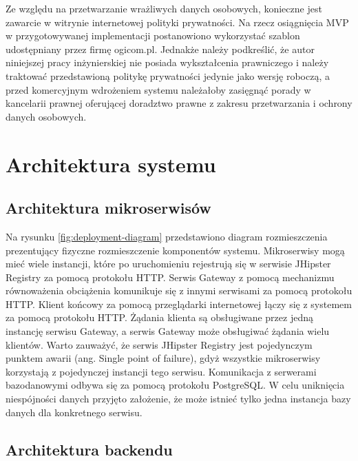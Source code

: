 \par
Ze względu na przetwarzanie wrażliwych danych osobowych, konieczne jest zawarcie w witrynie internetowej polityki prywatności.
Na rzecz osiągnięcia MVP w przygotowywanej implementacji postanowiono wykorzystać szablon udostępniany przez firmę ogicom.pl\cite{url:ogicom-privacy-policy}.
Jednakże należy podkreślić, że autor niniejszej pracy inżynierskiej nie posiada wykształcenia prawniczego
i należy traktować przedstawioną politykę prywatności jedynie jako wersję roboczą,
a przed komercyjnym wdrożeniem systemu należałoby zasięgnąć porady w kancelarii prawnej oferującej doradztwo prawne z zakresu przetwarzania i ochrony danych osobowych.

\section{Architektura systemu}\label{sec:system-architecture}
\subsection{Architektura mikroserwisów}\label{subsec:system-architecture:microservices}

\noindent
{}

Na rysunku \ref{fig:deployment-diagram} przedstawiono diagram rozmieszczenia prezentujący fizyczne rozmieszczenie komponentów systemu.
Mikroserwisy mogą mieć wiele instancji, które po uruchomieniu rejestrują się w serwisie JHipster Registry za pomocą protokołu HTTP.
Serwis Gateway z pomocą mechanizmu równoważenia obciążenia komunikuje się z innymi serwisami za pomocą protokołu HTTP.
Klient końcowy za pomocą przeglądarki internetowej łączy się z systemem za pomocą protokołu HTTP.
Żądania klienta są obsługiwane przez jedną instancję serwisu Gateway, a serwis Gateway może obsługiwać żądania wielu klientów.
Warto zauważyć, że serwis JHipster Registry jest pojedynczym punktem awarii (ang. Single point of failure), gdyż wszystkie mikroserwisy korzystają z pojedynczej instancji tego serwisu.
Komunikacja z serwerami bazodanowymi odbywa się za pomocą protokołu PostgreSQL.
W celu uniknięcia niespójności danych przyjęto założenie, że może istnieć tylko jedna instancja bazy danych dla konkretnego serwisu.

\subsection{Architektura backendu}\label{subsec:system-architecture:backend}

